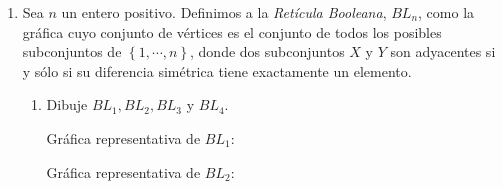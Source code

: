 \documentclass{article}
\newcommand{\set}[1]{%
  \left\{ #1 \right\}%
}
\begin{document}
\begin{enumerate}
\begin{proof}
\begin{itemize}
      Entonces, tenemos que:
      \begin{equation*}
        \begin{split}
          \abs{A_{D}} & = \sum_{j=1}^{\abs{A}} \sum_{i=1}^{\abs{V}} M^{-}_{ij} \\
          & = \sum_{i=1}^{\abs{V}} \sum_{j=1}^{\abs{A}} M^{-}_{ij} \\
          & = \sum_{i=1}^{\abs{V}} d^{-}(v_{i}) \\
          & = \sum_{v \in V} d^{-}(v)
        \end{split}
      \end{equation*}
    \end{itemize}
    Por lo tanto, queda demostrado que:
    \[
    \displaystyle \sum_{v \in V_D} d^+(v) = \sum_{v \in V_D} d^-(v) = |A_D|
    \]
  \end{proof}

\item  Sea $n$ un entero positivo. Definimos a la {\em Ret\'icula Booleana},
  $BL_n$, como la gr\'afica cuyo conjunto de vértices es el conjunto de todos
  los posibles subconjuntos de $\set{1, \cdots, n}$, donde dos subconjuntos
  $X$ y $Y$ son adyacentes si y s\'olo si su diferencia sim\'etrica tiene
  exactamente un elemento.
  
  \begin{enumerate}
  \item Dibuje $BL_1, BL_2, BL_3$ y $BL_4$.
    
    Gráfica representativa de $BL_1$:
    \begin{center}
    \end{center}
    
    Gráfica representativa de $BL_2$:
    \begin{center}
\end{center}
\end{enumerate}
\end{enumerate}
\end{document}

